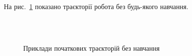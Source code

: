\documentclass[a4paper,10pt,fleqn]{article}
\begin{document}
На рис.~\ref{fig:bad-moves-samples} показано траєкторії робота без будь-якого навчання.
\begin{figure}
  \centering
  \,
   \\
  \,
  \caption{Приклади початкових траєкторій без навчання}
  \label{fig:bad-moves-samples}
\end{figure}
\end{document}

